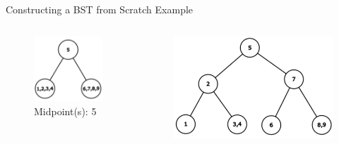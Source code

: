 \documentclass[aspectratio=169]{beamer}%
\begin{document}
\begin{frame}{Constructing a BST from Scratch Example}
    \begin{columns}
         \begin{column}{0.32\textwidth}
                \begin{figure}
                    \centering
                    \includegraphics[width = .9\linewidth]{const_bst1.png}
                    \caption{Midpoint(s): 5}
                \end{figure}
            \end{column}
            \hfill
            \begin{column}{0.32\textwidth}
                \begin{figure}
                    \centering
                    \includegraphics[width = .9\linewidth]{const_bst2.png}

\end{figure}
\end{column}
\end{columns}
\end{frame}
\end{document}
